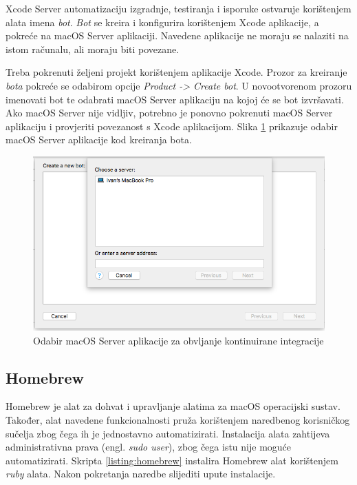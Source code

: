 \documentclass[times, utf8, diplomski, numeric]{fer}
\newcommand{\eng}[1]{(engl. \textit{#1})}
\begin{document}
Xcode Server automatizaciju izgradnje, testiranja i isporuke ostvaruje korištenjem alata imena \textit{bot}. \textit{Bot} se kreira i konfigurira korištenjem Xcode aplikacije, a pokreće na macOS Server aplikaciji. Navedene aplikacije ne moraju se nalaziti na istom računalu, ali moraju biti povezane.

Treba pokrenuti željeni projekt korištenjem aplikacije Xcode. Prozor za kreiranje \textit{bota} pokreće se odabirom opcije \textit{Product -> Create bot}. U novootvorenom prozoru imenovati bot te odabrati macOS Server aplikaciju na kojoj će se bot izvršavati. Ako macOS Server nije vidljiv, potrebno je ponovno pokrenuti macOS Server aplikaciju i provjeriti povezanost s Xcode aplikacijom. Slika \ref{fig:BotServerSelection} prikazuje odabir macOS Server aplikacije kod kreiranja bota.

\begin{figure}
\centering
\includegraphics[scale=0.4]{BotServerSelection}
\caption{Odabir macOS Server aplikacije za obvljanje kontinuirane integracije}
\label{fig:BotServerSelection}
\end{figure}

\subsection{Homebrew}

Homebrew je alat za dohvat i upravljanje alatima za macOS operacijski sustav\citep{homebrew}. Također, alat navedene funkcionalnosti pruža korištenjem naredbenog korisničkog sučelja zbog čega ih je jednostavno automatizirati. Instalacija alata zahtijeva administrativna prava \eng{sudo user}, zbog čega istu nije moguće automatizirati. Skripta \ref{listing:homebrew} instalira Homebrew alat korištenjem \textit{ruby} alata. Nakon pokretanja naredbe slijediti upute instalacije.
\end{document}
